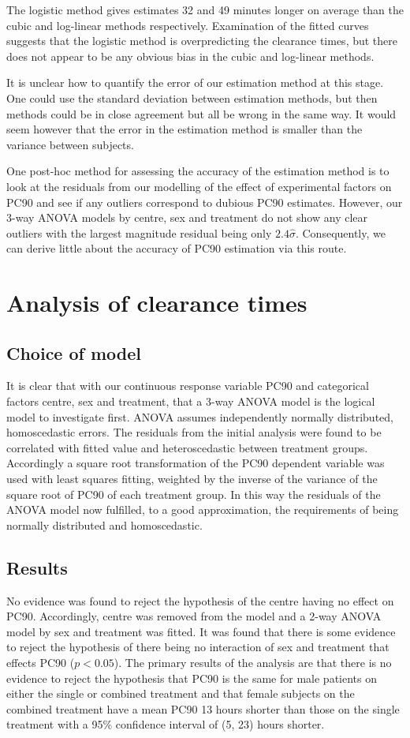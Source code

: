 The logistic method gives estimates 32 and 49 minutes longer on average than the cubic and log-linear methods respectively. Examination of the fitted curves suggests that the logistic method is overpredicting the clearance times, but there does not appear to be any obvious bias in the cubic and log-linear methods.

It is unclear how to quantify the error of our estimation method at this stage. One could use the standard deviation between estimation methods, but then methods could be in close agreement but all be wrong in the same way. It would seem however that the error in the estimation method is smaller than the variance between subjects. 

One post-hoc method for assessing the accuracy of the estimation method is to look at the residuals from our modelling of the effect of experimental factors on PC90 and see if any outliers correspond to dubious PC90 estimates. However, our 3-way ANOVA models by centre, sex and treatment do not show any clear outliers with the largest magnitude residual being only $2.4\hat{\sigma}$. Consequently, we can derive little about the accuracy of PC90 estimation via this route.

\section{Analysis of clearance times}
\subsection{Choice of model}
It is clear that with our continuous response variable PC90 and categorical factors centre, sex and treatment, that a 3-way ANOVA model is the logical model to investigate first. ANOVA assumes independently normally distributed, homoscedastic 
errors. The residuals from the initial analysis were found to be correlated with fitted value and heteroscedastic between treatment groups. Accordingly a square root transformation of the PC90 dependent variable was used with least squares fitting, weighted by the inverse of the variance of the square root of PC90 of each treatment group. In this way the residuals of the ANOVA model now fulfilled, to a good approximation, the requirements of being normally distributed and homoscedastic.

\subsection{Results}
No evidence was found to reject the hypothesis of the centre having no effect on PC90. Accordingly, centre was removed from the model and a 2-way ANOVA model by sex and treatment was fitted. It was found that there is some evidence to reject the hypothesis of there being no interaction of sex and treatment that effects PC90 ($p<0.05$). The primary results of the analysis are that there is no evidence to reject the hypothesis that PC90 is the same for male patients on either the single or combined treatment and that female subjects on the combined treatment have a mean PC90 13 hours shorter than those on the single treatment with a 95\% confidence interval of (5, 23) hours shorter.

